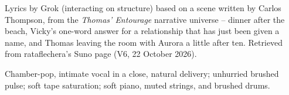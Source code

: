 
\label{sec:weird}
\begin{notes}
Lyrics by Grok (interacting on structure) based on a scene written by Carlos Thompson, from the \emph{Thomas' Entourage} narrative universe -- dinner after the beach, Vicky's one-word answer for a relationship that has just been given a name, and Thomas leaving the room with Aurora a little after ten. Retrieved from rataflechera's Suno page (V6, 22 October 2026).
\end{notes}
\begin{style}
Chamber-pop, intimate vocal in a close, natural delivery; unhurried brushed pulse; soft tape saturation; soft piano, muted strings, and brushed drums.
\end{style}

